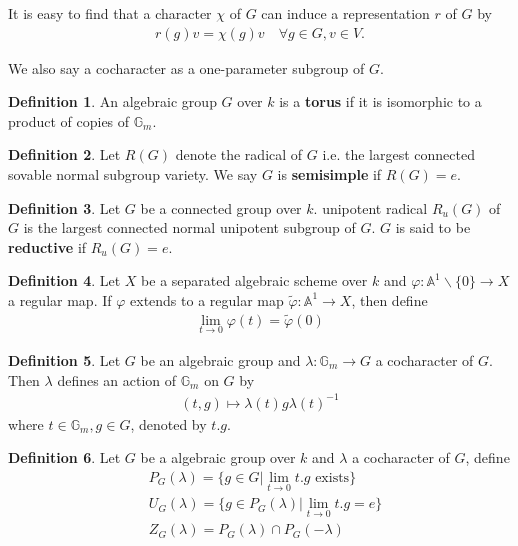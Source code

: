 \documentclass[10pt,UTF8]{article}
\theoremstyle{definition}
\newtheorem{definition}{Definition}[section]
\begin{document}
It is easy to find that a character $\chi$ of $G$ can induce a representation $r$ of $G$ by
\begin{align*}
  r(g)v = \chi(g)v \quad  \forall g\in G, v\in V.
\end{align*}

We also say a cocharacter as a one-parameter subgroup of $G$.
\begin{definition}
  An algebraic group $G$ over $k$ is a \textbf{torus} if it is isomorphic to a product of copies of $\mathbb{G}_m$.
\end{definition}


\begin{definition}
  Let $R(G)$ denote the radical of $G$ i.e. the largest connected sovable normal subgroup variety. We say $G$ is \textbf{semisimple} if $R(G) = e$.
\end{definition}



\begin{definition}
  Let $G$ be a connected group over $k$. unipotent radical $R_u(G)$ of $G$ is the largest connected normal unipotent subgroup of $G$. 
  $G$ is said to be \textbf{reductive} if $R_u(G)=e$.
\end{definition}

\begin{definition}
  Let $X$ be a separated algebraic scheme over $k$ and $\varphi:\mathbb{A}^1\backslash\{0\}\to X$ a regular map.
  If $\varphi$ extends to a regular map $\tilde{\varphi}:\mathbb{A}^1\to X$, then define
  \begin{align*}
    \lim_{t\to 0} \varphi(t)  = \tilde{\varphi}(0)
  \end{align*}
\end{definition}

\begin{definition}
  Let $G$ be an algebraic group and $\lambda:\mathbb{G}_m \to G$ a cocharacter of $G$. Then $\lambda$ defines an action of $\mathbb{G}_m$ on $G$ by
  \begin{align*}
    (t,g) \mapsto \lambda(t)g\lambda(t)^{-1}
  \end{align*}
  where $t\in \mathbb{G}_m,g\in G$, denoted by $t.g$.
\end{definition}
\begin{definition}
  Let $G$ be a algebraic group over $k$ and $\lambda$ a cocharacter of $G$, define
  \begin{align*}
    &P_G(\lambda) = \{g\in G|\lim_{t\to 0} t.g\text{ exists}\}\\
    &U_G(\lambda) = \{g\in P_G(\lambda)|\lim_{t\to 0} t.g = e\}\\
    &Z_G(\lambda) = P_G(\lambda)\cap P_G(-\lambda)
  \end{align*}
\end{definition}
\end{document}
